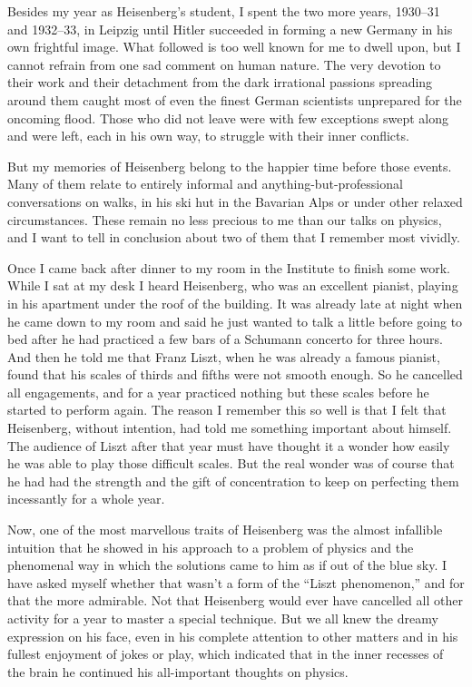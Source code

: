 \documentclass[12pt]{article}
\begin{document}
Besides my year as Heisenberg's student, I spent the two more years, 1930--31 and 1932--33, in Leipzig until Hitler succeeded in forming a new Germany in his own frightful image. What followed is too well known for me to dwell upon, but I cannot refrain from one sad comment on human nature. The very devotion to their work and their detachment from the dark irrational passions spreading around them caught most of even the finest German scientists unprepared for the oncoming flood. Those who did not leave were with few exceptions swept along and
were left, each in his own way, to struggle with their inner conflicts.

But my memories of Heisenberg belong to the happier time before those events. Many of them relate to entirely informal and anything-but-professional conversations on walks, in his ski hut in the Bavarian Alps or under other relaxed circumstances. These remain no less precious to me than our talks on physics, and I want to tell in conclusion about two of them that I remember most vividly.

Once I came back after dinner to my room in the Institute to finish some work. While I sat at my desk I heard Heisenberg, who was an excellent pianist, playing in his apartment under the roof of the
building. It was already late at night when he came down to my room and said he just wanted to talk a little before going to bed after he had practiced a few bars of a Schumann concerto for three hours. And then he told me that Franz Liszt, when he was already a famous pianist, found that his scales of thirds and fifths were not smooth enough. So he cancelled all engagements, and for a year practiced nothing but these scales before he started to perform again. The reason I remember this so well is that I felt that Heisenberg, without intention, had told me something important about himself. The audience of Liszt after that year must have thought it a wonder how easily he was able to play those difficult scales. But the real wonder was of course that he had had the strength and the gift of concentration to keep on perfecting them incessantly for a whole year.

Now, one of the most marvellous traits of Heisenberg was the almost infallible intuition that he showed in his approach to a problem of physics and the phenomenal way in which the solutions came to him as if out of the blue sky. I have asked myself whether that wasn't a form of the ``Liszt phenomenon,'' and for that the more admirable. Not that Heisenberg would ever have cancelled all other activity for a year to master a special technique. But we all knew the dreamy expression on his face, even in his complete attention to other matters and in his fullest enjoyment of jokes or play, which indicated that in the inner recesses of the brain he continued his all-important thoughts on physics.
\end{document}
